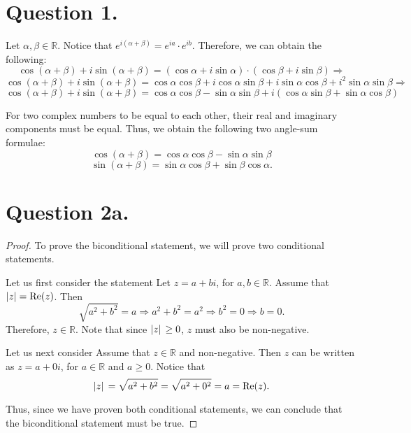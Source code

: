 \documentclass{article}
\begin{document}
\section*{Question 1.}

\noindent Let $ \alpha, \beta \in \mathbb{R}. $ Notice that $ e^{i(\alpha + \beta)} = e^{ia} \cdot e^{ib} $. Therefore, we can obtain the following:
\[
    \cos(\alpha + \beta) + i\sin(\alpha + \beta) = (\cos\alpha + i\sin\alpha) \cdot (\cos\beta + i\sin\beta) \Rightarrow
\]
\[
    \cos(\alpha + \beta) + i\sin(\alpha + \beta) = \cos\alpha\cos\beta + i\cos\alpha\sin\beta + i\sin\alpha\cos\beta + i^2\sin\alpha\sin\beta \Rightarrow
\]
\[
    \cos(\alpha + \beta) + i\sin(\alpha + \beta) = \cos\alpha\cos\beta - \sin\alpha\sin\beta + i(\cos\alpha\sin\beta + \sin\alpha\cos\beta)
\]

\noindent For two complex numbers to be equal to each other, their real and imaginary components must be equal. Thus, we obtain the following two angle-sum formulae:
\[
    \cos(\alpha + \beta) = \cos\alpha\cos\beta - \sin\alpha\sin\beta
\]
\[
    \sin(\alpha + \beta) = \sin\alpha\cos\beta + \sin\beta\cos\alpha.
\]

\section*{Question 2a.}
\begin{proof}
    To prove the biconditional statement, we will prove two conditional statements.

    \noindent Let us first consider the statement  Let $ z = a + bi $, for $ a, b \in \mathbb{R} $. Assume that $ \abs{z} = \Re(z) $. Then
    \[
        \sqrt{a^2 + b^2} = a \Rightarrow a^2 + b^2 = a^2 \Rightarrow b^2 = 0 \Rightarrow b = 0.
    \]
    Therefore, $ z \in \mathbb{R} $. Note that since $ \abs*{z} \geq 0 $, $ z $ must also be non-negative.

    \noindent Let us next consider  Assume that $ z \in \mathbb{R} $ and non-negative. Then $ z $ can be written as $ z = a + 0i $, for $ a \in \mathbb{R} $ and $ a \geq 0 $. Notice that
    \[
        \abs*{z} = \sqrt{a^2 + b^2} = \sqrt{a^2 + 0^2} = a = \Re(z).
    \]

    \noindent Thus, since we have proven both conditional statements, we can conclude that the biconditional statement must be true.
\end{proof}
\end{document}
